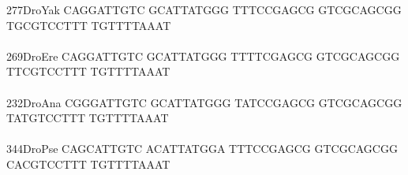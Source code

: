 \documentclass[11pt,twoside,reqno,a4paper]{article}
\begin{document}
{277\hspace*{1\charwidth}DroYak	CAGGATTGTC	GCATTATGGG	TTTCCGAGCG	GTCGCAGCGG	TGCGTCCTTT	TGTTTTAAAT	\\
\hspace*{4\charwidth}\hspace*{7\charwidth}\hspace*{1\charwidth}\hspace*{1\charwidth}\hspace*{1\charwidth}\hspace*{1\charwidth}\hspace*{1\charwidth}\hspace*{1\charwidth}\\
269\hspace*{1\charwidth}DroEre	CAGGATTGTC	GCATTATGGG	TTTTCGAGCG	GTCGCAGCGG	TTCGTCCTTT	TGTTTTAAAT	\\
\hspace*{4\charwidth}\hspace*{7\charwidth}\hspace*{1\charwidth}\hspace*{1\charwidth}\hspace*{1\charwidth}\hspace*{1\charwidth}\hspace*{1\charwidth}\hspace*{1\charwidth}\\
232\hspace*{1\charwidth}DroAna	CGGGATTGTC	GCATTATGGG	TATCCGAGCG	GTCGCAGCGG	TATGTCCTTT	TGTTTTAAAT	\\
\hspace*{4\charwidth}\hspace*{7\charwidth}\hspace*{1\charwidth}\hspace*{1\charwidth}\hspace*{1\charwidth}\hspace*{1\charwidth}\hspace*{1\charwidth}\hspace*{1\charwidth}\\
344\hspace*{1\charwidth}DroPse	CAGCATTGTC	ACATTATGGA	TTTCCGAGCG	GTCGCAGCGG	CACGTCCTTT	TGTTTTAAAT	\\
\hspace*{4\charwidth}\hspace*{7\charwidth}\hspace*{1\charwidth}\hspace*{1\charwidth}\hspace*{1\charwidth}\hspace*{1\charwidth}\hspace*{1\charwidth}\hspace*{1\charwidth}\\
}
\end{document}

